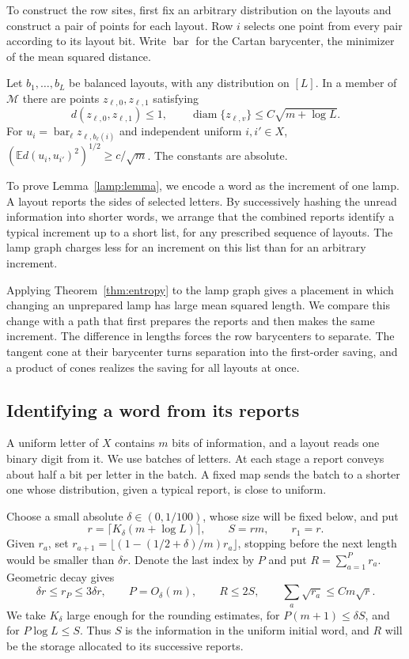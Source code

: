 To construct the row sites, first fix an arbitrary distribution on the
layouts and construct a pair of points for each layout. Row \(i\) selects one point from every
pair according to its layout bit. Write \(\operatorname{bar}\) for the
Cartan barycenter, the minimizer of the mean squared distance.

\begin{lemma}\label{lamp:lemma}
Let \(b_1,\ldots,b_L\) be balanced layouts, with any distribution
on \([L]\). In a member of \(\mathcal M\) there are points
\(z_{\ell,0},z_{\ell,1}\) satisfying
\[
 d(z_{\ell,0},z_{\ell,1})\le1,\qquad
 \operatorname{diam}\{z_{\ell,v}\}\le C\sqrt{m+\log L}.
\]
For \(u_i=\operatorname{bar}_{\ell} z_{\ell,b_\ell(i)}\) and
independent uniform \(i,i'\in X\),
\(
 (\mathbb E d(u_i,u_{i'})^2)^{1/2}\ge c/\sqrt m
\).
The constants are absolute.
\end{lemma}

To prove Lemma~\ref{lamp:lemma}, we encode a word as the increment of
one lamp. A layout reports the sides of selected letters. By successively hashing
the unread information into shorter words, we arrange that the combined
reports identify a typical increment up to a short list, for any
prescribed sequence of layouts. The lamp graph charges less for an increment on
this list than for an arbitrary increment.

Applying Theorem~\ref{thm:entropy} to the lamp graph gives a placement in
which changing an unprepared lamp has large mean squared length. We compare this change
with a path that first prepares the reports and then makes the same
increment. The difference in lengths forces the row barycenters to
separate. The tangent cone at their barycenter turns separation into
the first-order saving, and a product of cones realizes the saving for
all layouts at once.

\subsection{Identifying a word from its reports}

A uniform letter of \(X\) contains \(m\) bits of information, and a
layout reads one binary digit from it. We use batches of letters. At
each stage a report conveys about half a bit per letter in the batch.
A fixed map sends the batch to a shorter one whose distribution, given
a typical report, is close to uniform.

Choose a small absolute \(\delta\in(0,1/100)\), whose size will be
fixed below, and put
\[
  r=\lceil K_\delta(m+\log L)\rceil,\qquad S=rm,\qquad r_1=r.
\]
Given \(r_a\), set
\(r_{a+1}=\lfloor(1-(1/2+\delta)/m)r_a\rfloor\), stopping before
the next length would be smaller than \(\delta r\). Denote the last
index by \(P\) and put \(R=\sum_{a=1}^P r_a\). Geometric decay gives
\[
  \delta r\le r_P\le3\delta r,\qquad P=O_\delta(m),\qquad R\le2S,
  \qquad \sum_a\sqrt{r_a}\le C m\sqrt r.
\]
We take \(K_\delta\) large enough for the rounding estimates, for
\(P(m+1)\le\delta S\), and for \(P\log L\le S\). Thus \(S\) is the
information in the uniform initial word, and \(R\) will be the storage
allocated to its successive reports.

